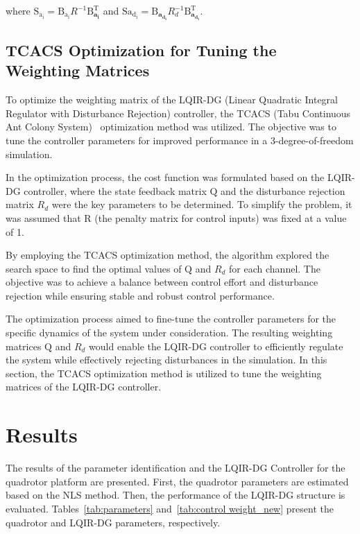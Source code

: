 \documentclass[3p]{elsarticle}
\begin{document}
where $
    \boldsymbol{\mathrm{S_{a_i}}} = \boldsymbol{\mathrm{B_{a_i}}}R^{-1}\boldsymbol{\mathrm{B}^\mathrm{T}_{a_i}}$ and $
    \boldsymbol{\mathrm{S{a_{d_i}}}} = \boldsymbol{\mathrm{B}_{a_{d_i}}}R_{d}^{-1}\boldsymbol{\mathrm{B}^\mathrm{T}_{a_{d_i}}}.
$%

\subsection{TCACS Optimization for Tuning the Weighting Matrices}
\noindent To optimize the weighting matrix of the LQIR-DG (Linear Quadratic Integral Regulator with Disturbance Rejection) controller, the TCACS (Tabu Continuous Ant Colony System)~\cite{10.1007/978-3-540-28646-2_27} optimization method was utilized. The objective was to tune the controller parameters for improved performance in a 3-degree-of-freedom simulation.

In the optimization process, the cost function was formulated based on the LQIR-DG controller, where the state feedback matrix $\boldsymbol{\mathrm{Q}}$ and the disturbance rejection matrix $R_d$ were the key parameters to be determined. To simplify the problem, it was assumed that R (the penalty matrix for control inputs) was fixed at a value of 1.

By employing the TCACS optimization method, the algorithm explored the search space to find the optimal values of $\boldsymbol{\mathrm{Q}}$ and $R_d$ for each channel. The objective was to achieve a balance between control effort and disturbance rejection while ensuring stable and robust control performance.

The optimization process aimed to fine-tune the controller parameters for the specific dynamics of the system under consideration. The resulting weighting matrices $\boldsymbol{\mathrm{Q}}$ and $R_d$ would enable the LQIR-DG controller to efficiently regulate the system while effectively rejecting disturbances in the simulation.
\noindent In this section, the TCACS optimization method is utilized to tune the weighting matrices of the LQIR-DG controller. 
\section{Results}\label{sec:results}
\noindent The results of the parameter identification and the LQIR-DG Controller for the quadrotor platform are presented. First, the quadrotor parameters are estimated based on the NLS method. Then, the performance of the LQIR-DG structure is evaluated.
Tables~\ref{tab:parameters} and~\ref{tab:control weight_new} present the quadrotor and LQIR-DG parameters, respectively.
\end{document}
